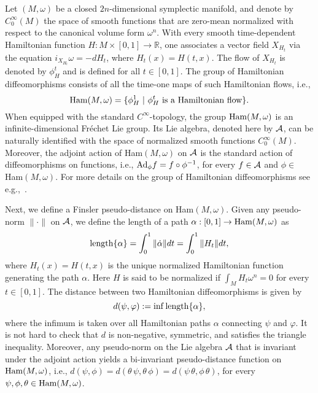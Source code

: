 \documentclass{icmart}
\theoremstyle{definition}
\begin{document}
%

\smallskip

Let $(M,\omega)$ be a closed $2n$-dimensional symplectic manifold,
and denote by $C^{\infty}_0(M)$ the space of smooth functions that
are zero-mean normalized with respect to the canonical volume form
$\omega^n$. With every smooth time-dependent Hamiltonian function $H: M \times [0,1] \rightarrow {\mathbb
R}$, %
one associates a  vector field $X_{H_t}$ %
via the equation $i_{X_{H_t}} \omega = - dH_t$, where $ H_t(x) =
H(t,x)$. The flow
of  $X_{H_t}$ %
is denoted by $\phi_H^t$ and is defined for all $t \in [0,1]$.
The %
group of Hamiltonian
diffeomorphisms consists of all the time-one maps of such
Hamiltonian flows, i.e.,
$$ {\rm Ham}(M,\omega) = \{ \phi_H^1 \ |  \ \phi_H^t \
{\rm is \ a \ Hamiltonian \ flow  } \}.$$ When  equipped with the
standard $C^{\infty}$-topology, the group 
${\rm Ham}(M,\omega)$ %
is an infinite-dimensional Fr\'echet Lie group. Its Lie algebra, denoted here by 
${\cal A}$, can be naturally identified with the space of normalized smooth functions $C^{\infty}_0(M)$.
Moreover, the adjoint action of Ham$(M,\omega)$ on ${\cal A}$ is the
standard action of diffeomorphisms on functions, i.e., ${\rm Ad}_\phi f = f
\circ \phi^{-1}$, for every $f \in {\cal A}$  and $\phi \in$
Ham$(M,\omega)$. For more details on the group of  Hamiltonian
diffeomorphisms see e.g.,~\cite{HZ, McSal,P1}. 

\smallskip

Next, we define a Finsler pseudo-distance on
Ham$(M,\omega)$. Given any pseudo-norm $\| \cdot \|$ on %
${\cal A}$, we define the length of a path $\alpha : [0,1]
\rightarrow {\rm Ham}(M,\omega)$ as
$$ {\rm length}\{ {\alpha}\} = \int_0^1 \| \dot \alpha \| dt =
\int_0^1 \| H_t \| dt ,$$ where $H_t(x)=H(t,x)$ is the unique
normalized Hamiltonian function generating the path $\alpha$. Here
$H$ is said to be normalized if $\int_M H_t \omega^n=0$ for every
$t\in [0,1]$. The distance between two Hamiltonian diffeomorphisms
is given by $$ d(\psi,\varphi) := \inf {\rm length} { \{ \alpha \}
},$$ where the infimum is taken over all Hamiltonian paths $\alpha$
connecting $\psi$ and $\varphi$. It is not hard to check that $d$ is
non-negative, symmetric, and satisfies the triangle inequality.
Moreover, any pseudo-norm on the Lie algebra ${\cal A}$ that is invariant under the
adjoint action yields a bi-invariant pseudo-distance function on ${\rm Ham} (M,\omega)$, i.e.,
 $d(\psi,\phi) = d(\theta \, \psi,\theta \, \phi) = d(\psi \, \theta ,\phi \, \theta)$,
 for every  $\psi,  \phi,  \theta \in {\rm Ham} (M,\omega)$.
\end{document}
